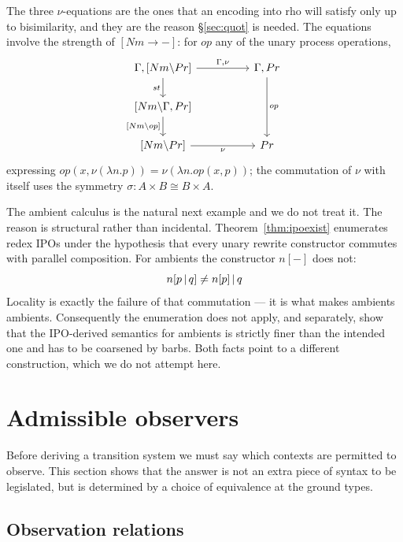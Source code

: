\documentclass{article}
\begin{document}
The three $\nu$-equations are the ones that an encoding into rho will satisfy only up to bisimilarity, and they are the reason \S\ref{sec:quot} is needed. The equations involve the strength of $[Nm\to -]$: for $op$ any of the unary process operations,
\[\begin{tikzcd}
	{\Gamma,[Nm\lam Pr]} && {\Gamma,Pr} \\
	{[Nm\lam \Gamma,Pr]} \\
	{[Nm\lam Pr]} && Pr
	\arrow["{\Gamma,\nu}", from=1-1, to=1-3]
	\arrow["st"', from=1-1, to=2-1]
	\arrow["op", from=1-3, to=3-3]
	\arrow["{[Nm\lam op]}"', from=2-1, to=3-1]
	\arrow["\nu"', from=3-1, to=3-3]
\end{tikzcd}\]
expressing $op(x,\nu (\lambda n.p)) = \nu (\lambda n.op(x,p))$; the commutation of $\nu$ with itself uses the symmetry $\sigma:A\times B\cong B\times A$.

\begin{remark}
\label{rem:ambient}
The ambient calculus \citep{amb-ipo-lts-sos} is the natural next example and we do not treat it. The reason is structural rather than incidental. Theorem~\ref{thm:ipoexist} enumerates redex IPOs under the hypothesis that every unary rewrite constructor commutes with parallel composition. For ambients the constructor $n[-]$ does not:
\[n[p\,|\, q]\neq n[p]\,|\, q\]
Locality is exactly the failure of that commutation --- it is what makes ambients ambients. Consequently the enumeration does not apply, and separately, \citet{amb-ipo-lts-sos} show that the IPO-derived semantics for ambients is strictly finer than the intended one and has to be coarsened by barbs. Both facts point to a different construction, which we do not attempt here.
\end{remark}
\section{Admissible observers}
\label{sec:obs}

Before deriving a transition system we must say which contexts are permitted to observe. This section shows that the answer is not an extra piece of syntax to be legislated, but is determined by a choice of equivalence at the ground types.

\subsection{Observation relations}
\end{document}
